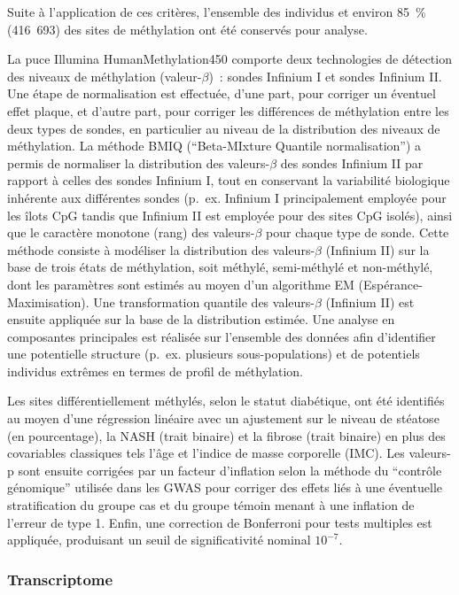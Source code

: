 \documentclass[11pt,a4paper,notrimn]{krantz}
\theoremstyle{definition}
\theoremstyle{definition}
\theoremstyle{remark}
\begin{document}
Suite à l'application de ces critères, l'ensemble des individus et
environ 85~\% (416~693) des sites de méthylation ont été conservés pour
analyse.

La puce Illumina HumanMethylation450 comporte deux technologies de
détection des niveaux de méthylation (valeur-\(\beta\))~: sondes
Infinium I et sondes Infinium II. Une étape de normalisation est
effectuée, d'une part, pour corriger un éventuel effet plaque, et
d'autre part, pour corriger les différences de méthylation entre les
deux types de sondes, en particulier au niveau de la distribution des
niveaux de méthylation. La méthode BMIQ (``Beta-MIxture Quantile
normalisation'') a permis de normaliser la distribution des
valeurs-\(\beta\) des sondes Infinium II par rapport à celles des sondes
Infinium I, tout en conservant la variabilité biologique inhérente aux
différentes sondes (p.~ex. Infinium I principalement employée pour les
îlots CpG tandis que Infinium II est employée pour des sites CpG
isolés), ainsi que le caractère monotone (rang) des valeurs-\(\beta\)
pour chaque type de sonde. Cette méthode consiste à modéliser la
distribution des valeurs-\(\beta\) (Infinium II) sur la base de trois
états de méthylation, soit méthylé, semi-méthylé et non-méthylé, dont
les paramètres sont estimés au moyen d'un algorithme EM
(Espérance-Maximisation). Une transformation quantile des
valeurs-\(\beta\) (Infinium II) est ensuite appliquée sur la base de la
distribution estimée. Une analyse en composantes principales est
réalisée sur l'ensemble des données afin d'identifier une potentielle
structure (p.~ex. plusieurs sous-populations) et de potentiels individus
extrêmes en termes de profil de méthylation.

Les sites différentiellement méthylés, selon le statut diabétique, ont
été identifiés au moyen d'une régression linéaire avec un ajustement sur
le niveau de stéatose (en pourcentage), la NASH (trait binaire) et la
fibrose (trait binaire) en plus des covariables classiques tels l'âge et
l'indice de masse corporelle (IMC). Les valeurs-p sont ensuite corrigées
par un facteur d'inflation selon la méthode du ``contrôle génomique''
utilisée dans les GWAS pour corriger des effets liés à une éventuelle
stratification du groupe cas et du groupe témoin menant à une inflation
de l'erreur de type 1. Enfin, une correction de Bonferroni pour tests
multiples est appliquée, produisant un seuil de significativité nominal
\(10^{-7}\).

\subsubsection{Transcriptome}\label{transcriptome-1}
\end{document}
